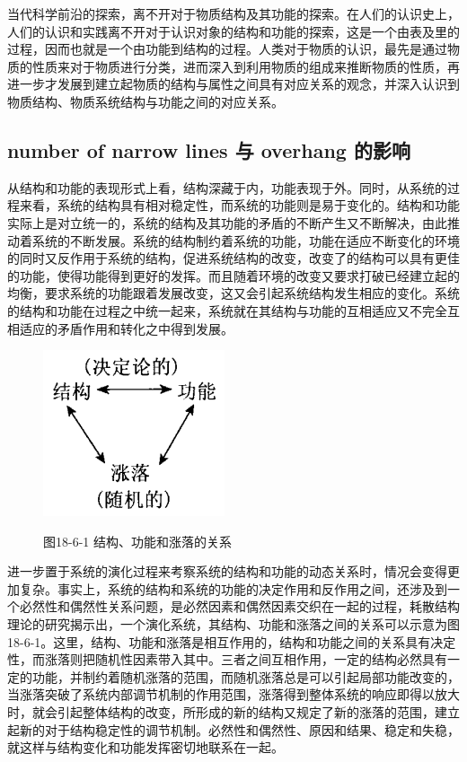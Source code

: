 \documentclass[UTF8]{ctexart}
\begin{document}
当代科学前沿的探索，离不开对于物质结构及其功能的探索。在人们的认识史上，人们的认识和实践离不开对于认识对象的结构和功能的探索，这是一个由表及里的过程，因而也就是一个由功能到结构的过程。人类对于物质的认识，最先是通过物质的性质来对于物质进行分类，进而深入到利用物质的组成来推断物质的性质，再进一步才发展到建立起物质的结构与属性之间具有对应关系的观念，并深入认识到物质结构、物质系统结构与功能之间的对应关系。


\subsection{number of narrow lines 与 overhang 的影响}
从结构和功能的表现形式上看，结构深藏于内，功能表现于外。同时，从系统的过程来看，系统的结构具有相对稳定性，而系统的功能则是易于变化的。结构和功能实际上是对立统一的，系统的结构及其功能的矛盾的不断产生又不断解决，由此推动着系统的不断发展。系统的结构制约着系统的功能，功能在适应不断变化的环境的同时又反作用于系统的结构，促进系统结构的改变，改变了的结构可以具有更佳的功能，使得功能得到更好的发挥。而且随着环境的改变又要求打破已经建立起的均衡，要求系统的功能跟着发展改变，这又会引起系统结构发生相应的变化。系统的结构和功能在过程之中统一起来，系统就在其结构与功能的互相适应又不完全互相适应的矛盾作用和转化之中得到发展。

\begin{figure}
  \begin{center}
    \includegraphics[width=.3\textwidth]{figure1.png}

    图18-6-1 结构、功能和涨落的关系
  \end{center}
\end{figure}

进一步置于系统的演化过程来考察系统的结构和功能的动态关系时，情况会变得更加复杂。事实上，系统的结构和系统的功能的决定作用和反作用之间，还涉及到一个必然性和偶然性关系问题，是必然因素和偶然因素交织在一起的过程，耗散结构理论的研究揭示出，一个演化系统，其结构、功能和涨落之间的关系可以示意为图18-6-1。这里，结构、功能和涨落是相互作用的，结构和功能之间的关系具有决定性，而涨落则把随机性因素带入其中。三者之间互相作用，一定的结构必然具有一定的功能，并制约着随机涨落的范围，而随机涨落总是可以引起局部功能改变的，当涨落突破了系统内部调节机制的作用范围，涨落得到整体系统的响应即得以放大时，就会引起整体结构的改变，所形成的新的结构又规定了新的涨落的范围，建立起新的对于结构稳定性的调节机制。必然性和偶然性、原因和结果、稳定和失稳，就这样与结构变化和功能发挥密切地联系在一起。
\end{document}
